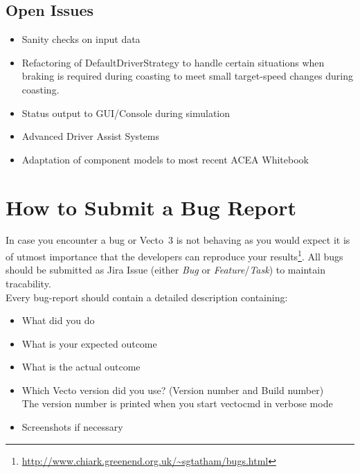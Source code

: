 \subsection{Open Issues} %
\label{sub:open_issues}

\begin{itemize}
	\item Sanity checks on input data
	\item Refactoring of DefaultDriverStrategy to handle certain situations when braking is required during coasting to meet small target-speed changes during coasting.
	\item Status output to GUI/Console during simulation
	\item Advanced Driver Assist Systems
	\item Adaptation of component models to most recent ACEA Whitebook
\end{itemize}


\FloatBarrier
\section{How to Submit a Bug Report} %
\label{sec:how_to_submit_a_bug_report}

In case you encounter a bug or Vecto~3 is not behaving as you would expect it is of utmost importance that the developers can reproduce your results\footnote{\url{http://www.chiark.greenend.org.uk/~sgtatham/bugs.html}}. All bugs should be submitted as Jira Issue (either \textit{Bug} or \textit{Feature}/\textit{Task}) to maintain tracability. \\[0.5em]

Every bug-report should contain a detailed description containing:
\begin{itemize}
	\item What did you do
	\item What is your expected outcome
	\item What is the actual outcome
	\item Which Vecto version did you use? (Version number and Build number) \\
		The version number is printed when you start vectocmd in verbose mode
	\item Screenshots if necessary
\end{itemize}

